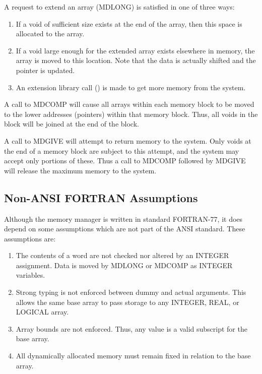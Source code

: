 A request to extend an array (MDLONG) is satisfied in one of three ways:
\begin{enumerate}
\item If a void of sufficient size exists at the end of the array, then
          this space is allocated to the array.

\item If a void large enough for the extended array exists elsewhere in
          memory, the array is moved to this location.  Note that the data
          is actually shifted and the pointer is updated.

\item An extension library call () is made to get more memory from
          the system.
\end{enumerate}

A call to MDCOMP will cause all arrays within each memory block to be moved
to the lower addresses (pointers) within that memory block.  Thus, all voids
in the block will be joined at the end of the block.

A call to MDGIVE will attempt to return memory to the system.  Only voids at
the end of a memory block are subject to this attempt, and the system may
accept only portions of these.  Thus a call to MDCOMP followed by MDGIVE
will release the maximum memory to the system.


\subsection{Non-ANSI FORTRAN Assumptions}
Although the memory manager is written in standard FORTRAN-77, it does
depend on some assumptions which are not part of the ANSI standard.  These
assumptions are:
\begin{enumerate}
\item The contents of a word are not checked nor altered by an INTEGER
          assignment.  Data is moved by MDLONG or MDCOMP as INTEGER
          variables.

\item Strong typing is not enforced between dummy and actual arguments.
          This allows the same base array to pass storage to any INTEGER,
          REAL, or LOGICAL array.

\item Array bounds are not enforced.  Thus, any value is a valid
          subscript for the base array.

\item All dynamically allocated memory must remain fixed in relation to
          the base array.
\end{enumerate}

